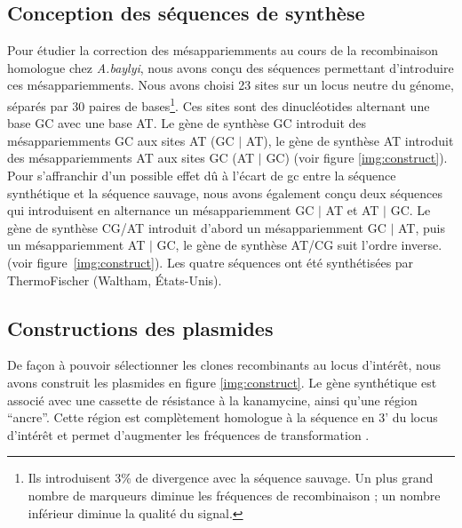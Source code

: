\subsection{Conception des séquences de synthèse}
\label{subsec:concept}

Pour étudier la correction des mésappariemments au cours de la recombinaison
homologue chez \emph{A.baylyi}, nous avons conçu des séquences permettant
d'introduire ces mésappariemments. Nous avons choisi 23 sites sur un locus
neutre du génome, séparés par 30 paires de bases\footnote{Ils introduisent 3\%
  de divergence avec la séquence sauvage. Un plus grand nombre de marqueurs
  diminue les fréquences de recombinaison ; un nombre inférieur diminue la
  qualité du signal.}. Ces sites sont des dinucléotides alternant une base GC
avec une base AT. Le gène de synthèse GC introduit des mésappariemments GC aux
sites AT (GC $|$ AT), le gène de synthèse AT introduit des mésappariemments AT
aux sites GC (AT $|$ GC) (voir figure \ref{img:construct}). Pour s'affranchir
d'un possible effet dû à l'écart de \ac{gc} entre la séquence synthétique et la
séquence sauvage, nous avons également conçu deux séquences qui introduisent en
alternance un mésappariemment GC $|$ AT et AT $|$ GC. Le gène de synthèse CG/AT
introduit d'abord un mésappariemment GC $|$ AT, puis un mésappariemment AT $|$
GC, le gène de synthèse AT/CG suit l'ordre inverse. (voir
figure~\ref{img:construct}). Les quatre séquences ont été synthétisées par
ThermoFischer (Waltham, États-Unis).

\subsection{Constructions des plasmides}
\label{subsec:constructions}

De façon à pouvoir sélectionner les clones recombinants au locus d'intérêt, nous
avons construit les plasmides en figure \ref{img:construct}. Le gène synthétique
est associé avec une cassette de résistance à la kanamycine, ainsi qu'une région
``ancre''. Cette région est complètement homologue à la séquence en 3' du locus
d'intérêt et permet d'augmenter les fréquences de transformation
\cite{de_vries_integration_2002}.

